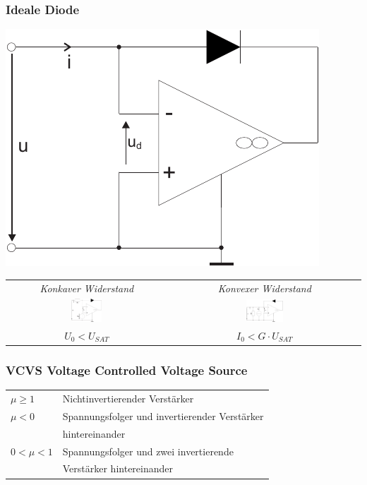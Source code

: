 \documentclass[a4paper,twocolumn,10pt]{article}
\begin{document}
\subsubsection*{Ideale Diode}
\begin{minipage}[b]{0.2\textwidth}
\includegraphics[width=\textwidth]{img/OP_IdealeDiode}
\end{minipage}

\begin{tabular}{c|c}
	\emph{Konkaver Widerstand} & \emph{Konvexer Widerstand}\\
\includegraphics[width=0.2\textwidth]{img/OP_Rkonkav} & \includegraphics[width=0.2\textwidth]{img/OP_Rkonvex}\\
$U_0<U_{SAT}$ & $I_0<G\cdot U_{SAT}$
\end{tabular}

\subsubsection*{VCVS Voltage Controlled Voltage Source}
\begin{tabular}{ll}
$\mu\geq 1$ & Nichtinvertierender Verstärker\\
$\mu<0$ & Spannungsfolger und invertierender Verstärker\\
& hintereinander\\
$0<\mu<1$ & Spannungsfolger und zwei invertierende\\
& Verstärker hintereinander
\end{tabular}
\end{document}
